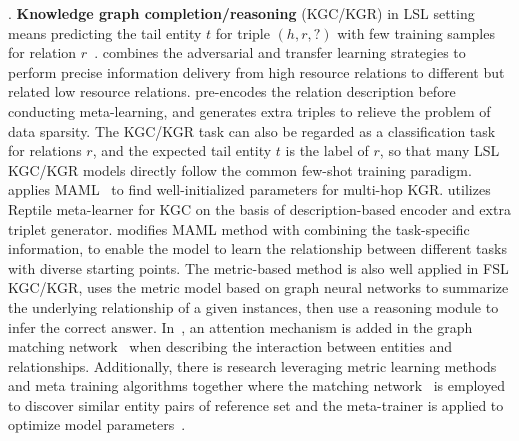 \uppercase\expandafter{}. \textbf{Knowledge graph completion/reasoning} (KGC/KGR) in LSL setting means predicting the tail entity $t$ for triple $(h, r, ?)$ with few training samples for relation $r$~.  combines the adversarial and transfer learning strategies to perform precise information delivery from high resource relations to different but related low resource relations.  pre-encodes the relation description before conducting meta-learning, and generates extra triples to relieve the problem of data sparsity. The KGC/KGR task can also be regarded as a classification task for relations $r$, and the expected tail entity $t$ is the label of $r$, so that many LSL KGC/KGR models directly follow the common few-shot training paradigm.  applies MAML~ to find well-initialized parameters for multi-hop KGR.  utilizes Reptile meta-learner for KGC on the basis of description-based encoder and extra triplet generator.  modifies MAML method with combining the task-specific information, to enable the model to learn the relationship between different tasks with diverse starting points. The metric-based method is also well applied in FSL KGC/KGR,  uses the metric model based on graph neural networks to summarize the underlying relationship of a given instances, then use a  reasoning module to infer the correct answer. In~, an attention mechanism is added in the graph matching network~ when describing the interaction between entities and relationships. Additionally, there is research leveraging metric learning methods and meta training algorithms together where the matching network~ is employed to discover similar entity pairs of reference set and the meta-trainer is applied to optimize model parameters~.
